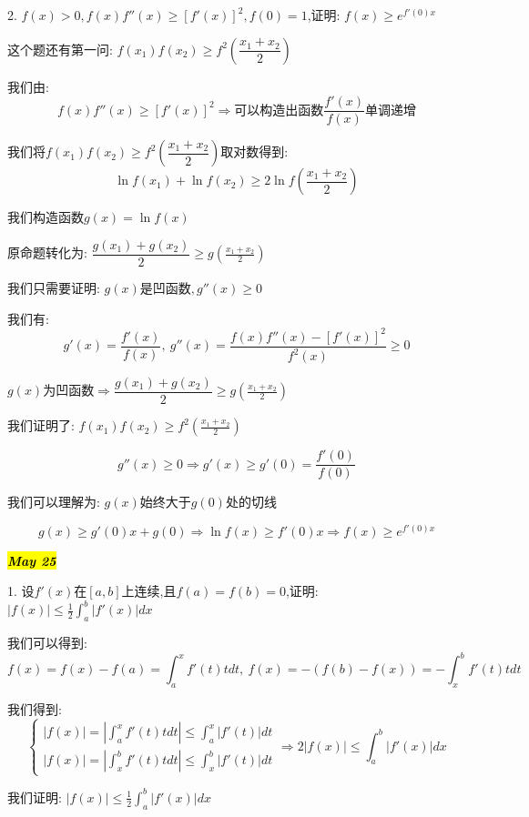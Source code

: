 2. $f(x)>0,f(x)f''(x)\geq [f'(x)]^2,f(0)=1$,证明: $f(x)\geq e^{f'(0)x}$
\begin{solution}
	
	这个题还有第一问: $f(x_{1})f(x_{2})\geq f^2(\dfrac{x_{1}+x_{2}}{2})$
	
	我们由: $$f(x)f''(x)\geq [f'(x)]^2\Rightarrow \text{可以构造出函数}\frac{f'(x)}{f(x)}\text{单调递增}$$
	
	我们将$f(x_{1})f(x_{2})\geq f^2(\dfrac{x_{1}+x_{2}}{2})$取对数得到: 
	$$\ln f(x_{1})+\ln f(x_{2})\geq 2\ln f(\frac{x_{1}+x_{2}}{2})$$
	
	我们构造函数$g(x)=\ln f(x)$
	
	原命题转化为: $\dfrac{g(x_{1})+g(x_{2})}{2}\geq g(\frac{x_{1}+x_{2}}{2})$
	
	我们只需要证明: $g(x)\text{是凹函数},g''(x)\geq 0$
	
	我们有: $$g'(x)=\dfrac{f'(x)}{f(x)},\ g''(x)=\dfrac{f(x)f''(x)-[f'(x)]^2}{f^2(x)}\geq 0$$
	
	$g(x)\text{为凹函数}\Rightarrow \dfrac{g(x_{1})+g(x_{2})}{2}\geq g(\frac{x_{1}+x_{2}}{2})$
	
	我们证明了: $f(x_{1})f(x_{2})\geq f^2(\frac{x_{1}+x_{2}}{2})$
	
	$$g''(x)\geq 0\Rightarrow g'(x)\geq g'(0)=\dfrac{f'(0)}{f(0)}$$
	
	我们可以理解为: $g(x)\text{始终大于}g(0)\text{处的切线}$
	
	$$g(x)\geq g'(0)x+g(0)\Rightarrow \ln f(x)\geq f'(0)x\Rightarrow f(x)\geq e^{f'(0)x}$$
\end{solution}

\hl{\textbf{\textit{May 25}}}

1. 设$f'(x)$在$[a,b]$上连续,且$f(a)=f(b)=0$,证明: $|f(x)|\leq \frac{1}{2}\int_{a}^{b}|f'(x)|dx$
\begin{solution}
	
	我们可以得到: $$f(x)=f(x)-f(a)=\int_{a}^{x}f'(t)tdt,\ f(x)=-(f(b)-f(x))=-\int_{x}^{b}f'(t)tdt$$
	
	我们得到: 
	$$\left\lbrace 
	\begin{array}{l}
		|f(x)|=|\int_{a}^{x}f'(t)tdt|\leq\int_{a}^{x}|f'(t)|dt\\
		|f(x)|=|\int_{x}^{b}f'(t)tdt|\leq\int_{x}^{b}|f'(t)|dt
	\end{array}
	\right. \Rightarrow 2|f(x)|\leq\int_{a}^{b}|f'(x)|dx$$
	
	我们证明: $|f(x)|\leq \frac{1}{2}\int_{a}^{b}|f'(x)|dx$
\end{solution}

